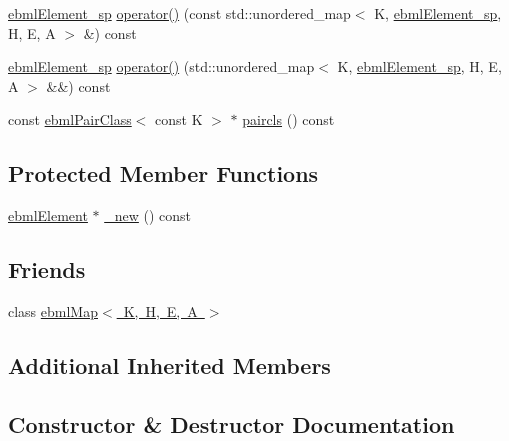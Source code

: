 \begin{DoxyCompactItemize}
\item 
\mbox{\hyperlink{namespaceebml_adad533b7705a16bb360fe56380c5e7be}{ebml\+Element\+\_\+sp}} \mbox{\hyperlink{classebml_1_1ebmlMapClass_ad87e8698f2933cd7ee8980c68c0b6361}{operator()}} (const std\+::unordered\+\_\+map$<$ K, \mbox{\hyperlink{namespaceebml_adad533b7705a16bb360fe56380c5e7be}{ebml\+Element\+\_\+sp}}, H, E, A $>$ \&) const
\item 
\mbox{\hyperlink{namespaceebml_adad533b7705a16bb360fe56380c5e7be}{ebml\+Element\+\_\+sp}} \mbox{\hyperlink{classebml_1_1ebmlMapClass_a189fe07c7ef4e9cbe9b7bc39746a5a18}{operator()}} (std\+::unordered\+\_\+map$<$ K, \mbox{\hyperlink{namespaceebml_adad533b7705a16bb360fe56380c5e7be}{ebml\+Element\+\_\+sp}}, H, E, A $>$ \&\&) const
\item 
const \mbox{\hyperlink{classebml_1_1ebmlPairClass}{ebml\+Pair\+Class}}$<$ const K $>$ $\ast$ \mbox{\hyperlink{classebml_1_1ebmlMapClass_ad38f9bbe85f05f8865e9df739ab34792}{paircls}} () const
\end{DoxyCompactItemize}
\subsection*{Protected Member Functions}
\begin{DoxyCompactItemize}
\item 
\mbox{\hyperlink{classebml_1_1ebmlElement}{ebml\+Element}} $\ast$ \mbox{\hyperlink{classebml_1_1ebmlMapClass_a3370b9b3457982693c08723af7d5130a}{\+\_\+new}} () const
\end{DoxyCompactItemize}
\subsection*{Friends}
\begin{DoxyCompactItemize}
\item 
class \mbox{\hyperlink{classebml_1_1ebmlMapClass_a691e480013452ea48661a61746fd1b5c}{ebml\+Map$<$ K, H, E, A $>$}}
\end{DoxyCompactItemize}
\subsection*{Additional Inherited Members}


\subsection{Constructor \& Destructor Documentation}
\mbox{\label{classebml_1_1ebmlMapClass_a54fe6d042e1b2e5c4ba9f8e3d7bba452}} 
